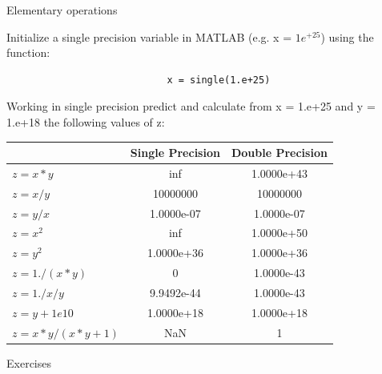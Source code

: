 \documentclass[aspectratio=169]{beamer}
\begin{document}
\begin{frame}[fragile]{Elementary operations}
    \small{
        Initialize a single precision variable in MATLAB (e.g. x = $1e^{+25}$) using the function:
        \vspace{-.3cm}
        \begin{verbatim}
                            x = single(1.e+25)
        \end{verbatim}
        \vspace{-.3cm}
        Working in single precision predict and calculate from x = 1.e+25  and y = 1.e+18 the following values of z:
    }
    
    \begin{table}
    \centering
    \begin{tabular}{l c c} 
    \hline
    \multicolumn{1}{l}{} & \multicolumn{1}{l}{\textbf{Single Precision}} & \textbf{Double Precision}  \\ 
    \hline
        $z = x * y$               & inf        & 1.0000e+43 \\
        $z = x / y$               & 10000000   & 10000000 \\
        $z = y / x$               & 1.0000e-07 & 1.0000e-07 \\
        $z = x^2$                 & inf        & 1.0000e+50 \\
        $z = y^2$                 & 1.0000e+36 & 1.0000e+36 \\
        $z = 1./(x*y)$            & 0          & 1.0000e-43 \\
        $z = 1./x/y$              & 9.9492e-44 & 1.0000e-43 \\
        $z = y + 1e10$            & 1.0000e+18 & 1.0000e+18 \\
        $z = x * y / (x * y + 1)$ & NaN        & 1 \\
    \hline
    \end{tabular}
    \end{table}
\end{frame}

{%
   \begin{frame}[standout]
      Exercises
   \end{frame}
}
\end{document}
